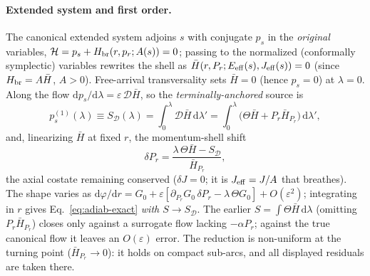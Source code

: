 \documentclass[12pt]{iopart}
\newcommand{\dd}{\mathrm{d}}
\begin{document}
\paragraph{Extended system and first order.} The canonical extended system adjoins $s$
with conjugate $p_s$ in the \emph{original} variables,
$\mathcal H=p_s+H_{\rm br}(r,p_r;A(s))=0$; passing to the normalized (conformally
symplectic) variables rewrites the shell as $\bar H(r,P_r;E_{\rm eff}(s),J_{\rm eff}(s))=0$
(since $H_{\rm br}=A\bar H$, $A>0$). Free-arrival transversality
sets $\bar H=0$ (hence $p_s=0$) at $\lambda=0$. Along the flow
$\dd p_s/\dd\lambda=\varepsilon\,\mathcal D\bar H$, so the \emph{terminally-anchored}
source is
\begin{equation}
    p_s^{(1)}(\lambda)\equiv S_{\mathcal D}(\lambda)
    =\int_0^{\lambda}\mathcal D\bar H\,\dd\lambda'
    =\int_0^{\lambda}\big(\Theta\bar H+P_r\bar H_{P_r}\big)\,\dd\lambda',
    \label{eq:pS-app}
\end{equation}
and, linearizing $\bar H$ at fixed $r$, the momentum-shell shift
\begin{equation}
    \delta P_r=\frac{\lambda\,\Theta\bar H-S_{\mathcal D}}{\bar H_{P_r}},
    \label{eq:dpr-app}
\end{equation}
the axial costate remaining conserved ($\delta J=0$; it is $J_{\rm eff}=J/A$ that
breathes). The shape varies as $\dd\varphi/\dd r=G_0+\varepsilon[\partial_{P_r}G_0\,\delta
P_r-\lambda\,\Theta G_0]+O(\varepsilon^2)$; integrating in $r$ gives
Eq.~\eqref{eq:adiab-exact} \emph{with $S\to S_{\mathcal D}$}. The earlier $S=\int\Theta\bar
H\,\dd\lambda$ (omitting $P_r\bar H_{P_r}$) closes only against a surrogate flow lacking
$-\alpha P_r$; against the true canonical flow it leaves an $O(\varepsilon)$ error. The
reduction is non-uniform at the turning point ($\bar H_{P_r}\to0$): it holds on compact
sub-arcs, and all displayed residuals are taken there.
\end{document}
